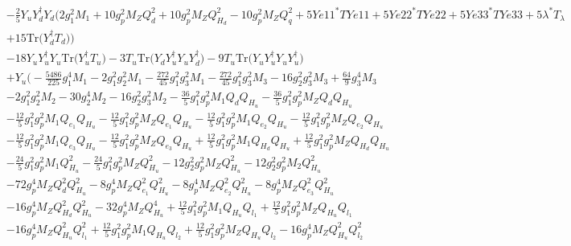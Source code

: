\begin{align}
 &-\frac{2}{5} {Y_u  Y_{d}^{\dagger}  Y_d} \Big(2 g_{1}^{2} M_1 +10 g_{p}^{2} M_Z Q_{d}^{2} +10 g_{p}^{2} M_Z Q_{H_d}^{2} -10 g_{p}^{2} M_Z Q_{q}^{2} +5 Ye11^* TYe11 +5 Ye22^* TYe22 +5 Ye33^* TYe33 +5 \lambda^* T_{\lambda} \nonumber \\ 
 &+15 \mbox{Tr}\Big({Y_{d}^{\dagger}  T_d}\Big) \Big)\nonumber \\ 
 &-18 {Y_u  Y_{u}^{\dagger}  Y_u} \mbox{Tr}\Big({Y_{u}^{\dagger}  T_u}\Big) -3 T_u \mbox{Tr}\Big({Y_d  Y_{u}^{\dagger}  Y_u  Y_{d}^{\dagger}}\Big) -9 T_u \mbox{Tr}\Big({Y_u  Y_{u}^{\dagger}  Y_u  Y_{u}^{\dagger}}\Big) \nonumber \\ 
 &+Y_u \Big(-\frac{5486}{225} g_{1}^{4} M_1 -2 g_{1}^{2} g_{2}^{2} M_1 -\frac{272}{45} g_{1}^{2} g_{3}^{2} M_1 -\frac{272}{45} g_{1}^{2} g_{3}^{2} M_3 -16 g_{2}^{2} g_{3}^{2} M_3 +\frac{64}{9} g_{3}^{4} M_3 \nonumber \\ 
 &-2 g_{1}^{2} g_{2}^{2} M_2 -30 g_{2}^{4} M_2 -16 g_{2}^{2} g_{3}^{2} M_2 -\frac{36}{5} g_{1}^{2} g_{p}^{2} M_1 Q_{d} Q_{H_u} -\frac{36}{5} g_{1}^{2} g_{p}^{2} M_Z Q_{d} Q_{H_u} \nonumber \\ 
 &-\frac{12}{5} g_{1}^{2} g_{p}^{2} M_1 Q_{e_{1}} Q_{H_u} -\frac{12}{5} g_{1}^{2} g_{p}^{2} M_Z Q_{e_{1}} Q_{H_u} -\frac{12}{5} g_{1}^{2} g_{p}^{2} M_1 Q_{e_{2}} Q_{H_u} -\frac{12}{5} g_{1}^{2} g_{p}^{2} M_Z Q_{e_{2}} Q_{H_u} \nonumber \\ 
 &-\frac{12}{5} g_{1}^{2} g_{p}^{2} M_1 Q_{e_3} Q_{H_u} -\frac{12}{5} g_{1}^{2} g_{p}^{2} M_Z Q_{e_3} Q_{H_u} +\frac{12}{5} g_{1}^{2} g_{p}^{2} M_1 Q_{H_d} Q_{H_u} +\frac{12}{5} g_{1}^{2} g_{p}^{2} M_Z Q_{H_d} Q_{H_u} \nonumber \\ 
 &-\frac{24}{5} g_{1}^{2} g_{p}^{2} M_1 Q_{H_u}^{2} -\frac{24}{5} g_{1}^{2} g_{p}^{2} M_Z Q_{H_u}^{2} -12 g_{2}^{2} g_{p}^{2} M_Z Q_{H_u}^{2} -12 g_{2}^{2} g_{p}^{2} M_2 Q_{H_u}^{2} \nonumber \\ 
 &-72 g_{p}^{4} M_Z Q_{d}^{2} Q_{H_u}^{2} -8 g_{p}^{4} M_Z Q_{e_{1}}^{2} Q_{H_u}^{2} -8 g_{p}^{4} M_Z Q_{e_{2}}^{2} Q_{H_u}^{2} -8 g_{p}^{4} M_Z Q_{e_3}^{2} Q_{H_u}^{2} \nonumber \\ 
 &-16 g_{p}^{4} M_Z Q_{H_d}^{2} Q_{H_u}^{2} -32 g_{p}^{4} M_Z Q_{H_u}^{4} +\frac{12}{5} g_{1}^{2} g_{p}^{2} M_1 Q_{H_u} Q_{l_1} +\frac{12}{5} g_{1}^{2} g_{p}^{2} M_Z Q_{H_u} Q_{l_1} \nonumber \\ 
 &-16 g_{p}^{4} M_Z Q_{H_u}^{2} Q_{l_1}^{2} +\frac{12}{5} g_{1}^{2} g_{p}^{2} M_1 Q_{H_u} Q_{l_2} +\frac{12}{5} g_{1}^{2} g_{p}^{2} M_Z Q_{H_u} Q_{l_2} -16 g_{p}^{4} M_Z Q_{H_u}^{2} Q_{l_2}^{2} \nonumber \\ 

\end{align}
